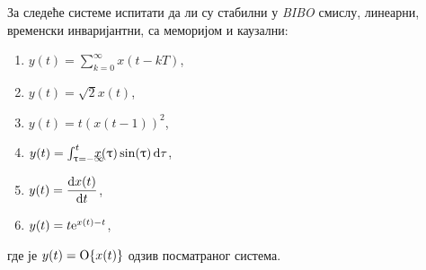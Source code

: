 \PID
За следеће системе испитати да ли су стабилни
у \textit{BIBO} смислу,
линеарни, временски инваријантни, 
са меморијом и каузални: 
\begin{multicols}{3}
\begin{enumerate}[label=(\alph*)]
\item $y(t) = \sum_{k = 0}^{\infty} x(t-kT)$, 
\item $y(t) = \sqrt{2} x(t)$,
\item $y(t) = t \left( x(t-1) \right)^2$,
\item $y(t) = \int_{\uptau = -\infty}^{t}
\hspace{-0.99em}
x(\uptau) \sin(\uptau) \,{\rm d}\tau$,
\item $y(t) = \dfrac{{\rm d} x(t)}{{\rm d} t}
$,
\item $y(t) =t {\rm e}^{x(t) - t}$,
\end{enumerate}
\end{multicols}\noindent
где је $y(t) = {\rm O}\{x(t)\}$ одзив посматраног система.
\\[2mm]

